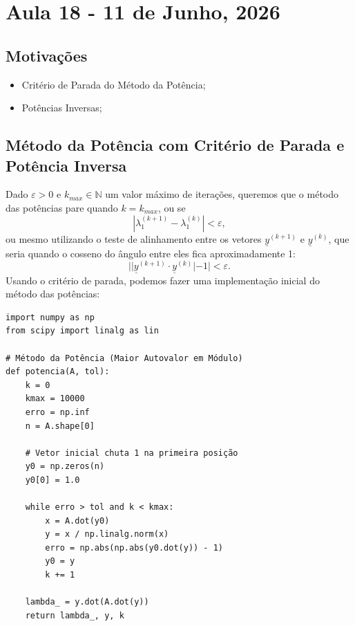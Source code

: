\documentclass[../numerical_methods.tex]{subfiles}
\begin{document}
\section{Aula 18 - 11 de Junho, 2026}
\subsection{Motivações}
\begin{itemize}
	\item Critério de Parada do Método da Potência;
	\item Potências Inversas;
\end{itemize}
\subsection{Método da Potência com Critério de Parada e Potência Inversa}
Dado \(\varepsilon > 0\) e \(k_{max}\in \mathbb{N}\) um valor máximo de iterações, queremos que o método das potências pare quando \(k=k_{max}\), ou se
\[
	| \lambda_{1}^{(k+1)} - \lambda_{1}^{(k)} | < \varepsilon,
\]
ou mesmo utilizando o teste de alinhamento entre os vetores \(\underline{y}^{(k+1)}\) e \(\underline{y}^{(k)}\), que seria quando o cosseno do ângulo entre eles fica aproximadamente 1:
\[
	| | \underline{y}^{(k+1)} \cdot \underline{y}^{(k)} | - 1 | < \varepsilon .
\]
Usando o critério de parada, podemos fazer uma implementação inicial do método das potências:
\begin{listing}[H]
	\caption{Método da Potência com critério de parada}
	\begin{verbatim}
import numpy as np
from scipy import linalg as lin

# Método da Potência (Maior Autovalor em Módulo)
def potencia(A, tol):
    k = 0
    kmax = 10000
    erro = np.inf
    n = A.shape[0]

    # Vetor inicial chuta 1 na primeira posição
    y0 = np.zeros(n)
    y0[0] = 1.0

    while erro > tol and k < kmax:
        x = A.dot(y0)
        y = x / np.linalg.norm(x)
        erro = np.abs(np.abs(y0.dot(y)) - 1)
        y0 = y
        k += 1

    lambda_ = y.dot(A.dot(y))
    return lambda_, y, k
   \end{verbatim}
\end{listing}
\end{document}

